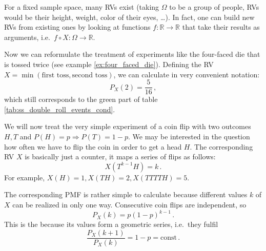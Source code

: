 

For a fixed sample space, many RVs exist (taking $\Omega$ to be a group of people, RVs would be their height, weight, color of their eyes, \dots). In fact, one can build new RVs from existing ones by looking at functions $f: \mathbb{R} \rightarrow \mathbb{R}$ that take their results as arguments, i.e.~$f \circ X: \Omega \rightarrow \mathbb{R}$.


\begin{ex}
Now we can reformulate the treatment of experiments like the four-faced die that is tossed twice (see example \ref{ex:four_faced_die}). Defining the RV $X = \min(\text{first toss}, \text{second toss})$, we can calculate in very convenient notation:
\begin{equation*}
P_X(2) = \frac{5}{16} \, ,
\end{equation*}
which still corresponds to the green part of table \ref{tab:ss_double_roll_events_cond}.
\end{ex}


\begin{ex}\label{ex:coin_flip_rvs}
We will now treat the very simple experiment of a coin flip with two outcomes $H, T$ and $P(H) = p \Rightarrow P(T) = 1 - p$. We may be interested in the question how often we have to flip the coin in order to get a head $H$. The corresponding RV $X$ is basically just a counter, it maps a series of flips as follows:
\begin{equation*}
X(T^{k - 1} H) = k \, .
\end{equation*}
For example, $X(H) = 1, X(TH) = 2, X(TTTTH) = 5$.

The corresponding PMF is rather simple to calculate because different values $k$ of $X$ can be realized in only one way. Consecutive coin flips are independent, so
\begin{equation*}
P_X(k) = p (1 - p)^{k - 1} \, .
\end{equation*}
This is the  because its values form a geometric series, i.e.~they fulfil
\begin{equation*}
\frac{P_X(k + 1)}{P_X(k)} = 1 - p = \text{const} \, .
\end{equation*}
\end{ex}


